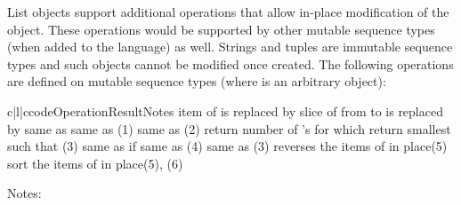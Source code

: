 List objects support additional operations that allow in-place
modification of the object.
These operations would be supported by other mutable sequence types
(when added to the language) as well.
Strings and tuples are immutable sequence types and such objects cannot
be modified once created.
The following operations are defined on mutable sequence types (where
 is an arbitrary object):

\begin{tableiii}{c|l|c}{code}{Operation}{Result}{Notes}
	{item  of  is replaced by }{}
  	{slice of  from  to  is replaced by }{}
	{same as }{}
	{same as }{(1)}
        {same as }{(2)}
    {return number of 's for which }{}
    {return smallest  such that }{(3)}
	{same as 
	  if }{}
    {same as }{(4)}
	{same as }{(3)}
	{reverses the items of  in place}{(5)}
	{sort the items of  in place}{(5), (6)}
\end{tableiii}
\noindent
Notes:
